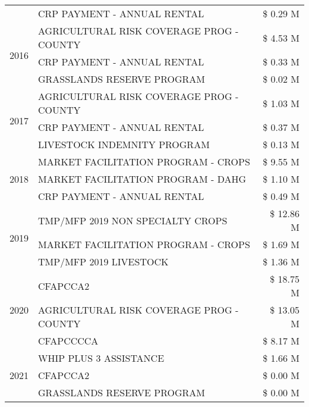 \begin{tabular}{llr}
 & CRP PAYMENT - ANNUAL RENTAL & \$ 0.29 M \\
\cline{1-3}
\multirow[t]{3}{*}{2016} & AGRICULTURAL RISK COVERAGE PROG - COUNTY & \$ 4.53 M \\
 & CRP PAYMENT - ANNUAL RENTAL & \$ 0.33 M \\
 & GRASSLANDS RESERVE PROGRAM & \$ 0.02 M \\
\cline{1-3}
\multirow[t]{3}{*}{2017} & AGRICULTURAL RISK COVERAGE PROG - COUNTY & \$ 1.03 M \\
 & CRP PAYMENT - ANNUAL RENTAL & \$ 0.37 M \\
 & LIVESTOCK INDEMNITY PROGRAM & \$ 0.13 M \\
\cline{1-3}
\multirow[t]{3}{*}{2018} & MARKET FACILITATION PROGRAM - CROPS & \$ 9.55 M \\
 & MARKET FACILITATION PROGRAM - DAHG & \$ 1.10 M \\
 & CRP PAYMENT - ANNUAL RENTAL & \$ 0.49 M \\
\cline{1-3}
\multirow[t]{3}{*}{2019} & TMP/MFP 2019 NON SPECIALTY CROPS & \$ 12.86 M \\
 & MARKET FACILITATION PROGRAM - CROPS & \$ 1.69 M \\
 & TMP/MFP 2019 LIVESTOCK & \$ 1.36 M \\
\cline{1-3}
\multirow[t]{3}{*}{2020} & CFAPCCA2 & \$ 18.75 M \\
 & AGRICULTURAL RISK COVERAGE PROG - COUNTY & \$ 13.05 M \\
 & CFAPCCCCA & \$ 8.17 M \\
\cline{1-3}
\multirow[t]{3}{*}{2021} & WHIP PLUS 3 ASSISTANCE & \$ 1.66 M \\
 & CFAPCCA2 & \$ 0.00 M \\
 & GRASSLANDS RESERVE PROGRAM & \$ 0.00 M \\
\cline{1-3}
\bottomrule
\end{tabular}
